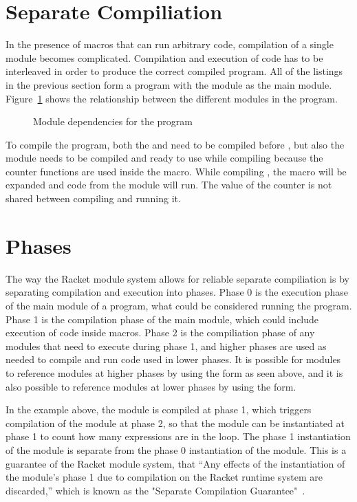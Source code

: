 \section{Separate Compiliation}
In the presence of macros that can run arbitrary code, compilation of a single module becomes complicated. 
Compilation and execution of code has to be interleaved in order to produce the correct compiled program.
All of the listings in the previous section form a program with the  module as the main module.
Figure~\ref{fig:modules.tex} shows the relationship between the different modules in the program.
\begin{figure}
  
  \caption{Module dependencies for the  program}
  \label{fig:modules.tex}
\end{figure}
To compile the program, both the  and  need to be compiled before , but also the  module needs to be compiled and ready to use while compiling  because the counter functions are used inside the  macro.
While compiling , the  macro will be expanded and code from the  module will run.
The value of the counter is not shared between compiling  and running it.

\section{Phases}
The way the Racket module system allows for reliable separate compiliation is by separating compilation and execution into phases.
Phase 0 is the execution phase of the main module of a program, what could be considered running the program.
Phase 1 is the compilation phase of the main module, which could include execution of code inside macros. 
Phase 2 is the compiliation phase of any modules that need to execute during phase 1, and higher phases are used as needed to compile and run code used in lower phases.
It is possible for modules to reference modules at higher phases by using the  form as seen above, and it is also possible to reference modules at lower phases by using the  form.

In the example above, the  module is compiled at phase 1, which triggers compilation of the  module at phase 2, so that the  module can be instantiated at phase 1 to count how many expressions are in the  loop.
The phase 1 instantiation of the  module is separate from the phase 0 instantiation of the module.
This is a guarantee of the Racket module system, that ``Any effects of the instantiation of the module's phase 1 due to compilation on the Racket runtime system are discarded,'' which is known as the "Separate Compilation Guarantee"~\cite{}.

